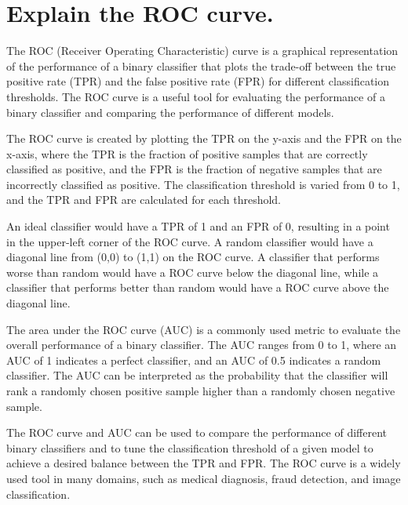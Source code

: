 \section{Explain the ROC curve.}
The ROC (Receiver Operating Characteristic) curve is a graphical representation of the performance of a binary classifier that plots the trade-off between the true positive rate (TPR) and the false positive rate (FPR) for different classification thresholds. The ROC curve is a useful tool for evaluating the performance of a binary classifier and comparing the performance of different models.

The ROC curve is created by plotting the TPR on the y-axis and the FPR on the x-axis, where the TPR is the fraction of positive samples that are correctly classified as positive, and the FPR is the fraction of negative samples that are incorrectly classified as positive. The classification threshold is varied from 0 to 1, and the TPR and FPR are calculated for each threshold.

An ideal classifier would have a TPR of 1 and an FPR of 0, resulting in a point in the upper-left corner of the ROC curve. A random classifier would have a diagonal line from (0,0) to (1,1) on the ROC curve. A classifier that performs worse than random would have a ROC curve below the diagonal line, while a classifier that performs better than random would have a ROC curve above the diagonal line.

The area under the ROC curve (AUC) is a commonly used metric to evaluate the overall performance of a binary classifier. The AUC ranges from 0 to 1, where an AUC of 1 indicates a perfect classifier, and an AUC of 0.5 indicates a random classifier. The AUC can be interpreted as the probability that the classifier will rank a randomly chosen positive sample higher than a randomly chosen negative sample.

The ROC curve and AUC can be used to compare the performance of different binary classifiers and to tune the classification threshold of a given model to achieve a desired balance between the TPR and FPR. The ROC curve is a widely used tool in many domains, such as medical diagnosis, fraud detection, and image classification.

